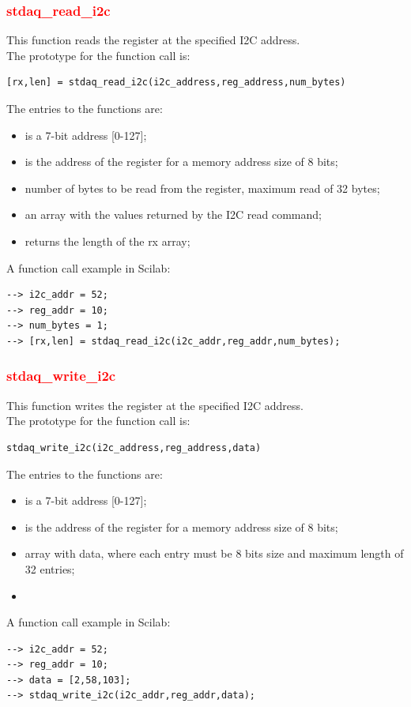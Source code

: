 \documentclass[letterpaper,10pt,english]{hitec}
\begin{document}
\subsubsection{\textcolor{red}{stdaq\_read\_i2c}}
This function reads the register at the specified I2C address. \\
The prototype for the function call is: 
\begin{verbatim}
[rx,len] = stdaq_read_i2c(i2c_address,reg_address,num_bytes)
\end{verbatim}
The entries to the functions are:
\begin{itemize}
\item [\textbf{[i2c\_address (IN)]}] is a 7-bit address [0-127];
\item [\textbf{[reg\_address (IN)]}] is the address of the register for a memory address size of 8 bits;
\item [\textbf{[num\_bytes (IN)]}] number of bytes to be read from the register, maximum read of 32 bytes;
\item [\textbf{[rx (OUT)]}] an array with the values returned by the I2C read command;
\item [\textbf{[len (OUT)]}] returns the length of the rx array;
\end{itemize}
A function call example in Scilab:
\begin{verbatim}
--> i2c_addr = 52;
--> reg_addr = 10;
--> num_bytes = 1;
--> [rx,len] = stdaq_read_i2c(i2c_addr,reg_addr,num_bytes);
\end{verbatim}

\subsubsection{\textcolor{red}{stdaq\_write\_i2c}}
This function writes the register at the specified I2C address. \\
The prototype for the function call is: 
\begin{verbatim}
stdaq_write_i2c(i2c_address,reg_address,data)
\end{verbatim}
The entries to the functions are:
\begin{itemize}
\item [\textbf{[i2c\_address (IN)]}] is a 7-bit address [0-127];
\item [\textbf{[reg\_address (IN)]}] is the address of the register for a memory address size of 8 bits;
\item [\textbf{[data (IN)]}] array with data, where each entry must be 8 bits size and maximum length of 32 entries;
\item [\textbf{[none (OUT)]}] 
\end{itemize}
A function call example in Scilab:
\begin{verbatim}
--> i2c_addr = 52;
--> reg_addr = 10;
--> data = [2,58,103];
--> stdaq_write_i2c(i2c_addr,reg_addr,data);
\end{verbatim}
\end{document}
